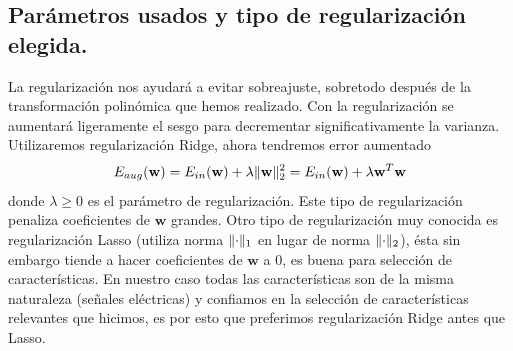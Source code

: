 \documentclass[11pt,a4paper]{article}
\DeclarePairedDelimiter{\norm}{\lVert}{\rVert}
\theoremstyle{definition}
\begin{document}
	\subsection{Parámetros usados y tipo de regularización elegida.}
	La regularización nos ayudará a evitar sobreajuste, sobretodo después de la transformación polinómica que hemos realizado. Con la regularización se aumentará ligeramente el sesgo para decrementar significativamente la varianza. Utilizaremos regularización Ridge, ahora tendremos error aumentado 
	$$E_{aug}(\mathbf{w})=E_{in}(\mathbf{w})+\lambda \norm{\mathbf{w}}_2^2 = E_{in}(\mathbf{w})+\lambda \mathbf{w}^T\mathbf{w}$$
	donde $\lambda \geq 0$ es el parámetro de regularización. Este tipo de regularización penaliza coeficientes de $\mathbf{w}$ grandes. Otro tipo de regularización muy conocida es regularización Lasso (utiliza norma $\norm{\cdot}_1$ en lugar de norma $\norm{\cdot}_2$), ésta sin embargo tiende a hacer coeficientes de $\mathbf{w}$ a 0, es buena para selección de características. En nuestro caso todas las características son de la misma naturaleza (señales eléctricas) y confiamos en la selección de características relevantes que hicimos, es por esto que preferimos regularización Ridge antes que Lasso.\\
	
	
\end{document}
